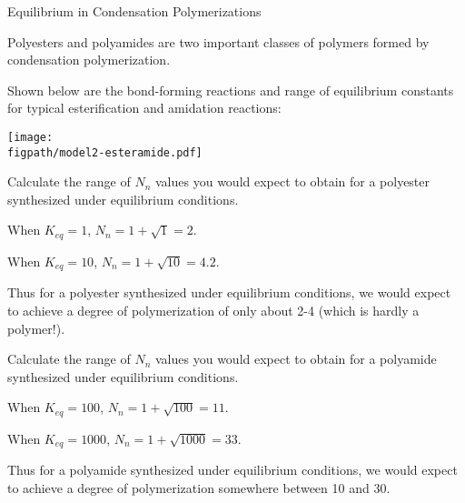 \begin{activity}{Equilibrium in Condensation Polymerizations}
\begin{ctqs}
\end{ctqs}
	
\begin{model}
\label{\labelbase:mdl:K}

Polyesters and polyamides are two important classes of polymers formed by condensation polymerization.

Shown below are the bond-forming reactions and range of equilibrium constants for typical esterification and amidation reactions:
	
		\vspace{0.1in}
		\centerline{\texttt{[image: \\figpath/model2-esteramide.pdf]}}

\end{model}

\begin{ctqs}
		\question Calculate the range of $N_n$ values you would expect to obtain for a polyester synthesized under equilibrium conditions.
		
			\begin{solution}[1.5in]{}
			
				When $K_{eq}=1$, $N_n = 1+ \sqrt{1} = 2$.
			
				When $K_{eq}=10$, $N_n = 1+ \sqrt{10} = 4.2$.
				
				Thus for a polyester synthesized under equilibrium conditions, we would expect to achieve a degree of polymerization of only about 2-4 (which is hardly a polymer!).			
			
			\end{solution}
		
		\question Calculate the range of $N_n$ values you would expect to obtain for a polyamide synthesized under equilibrium conditions.
		
			\begin{solution}[1.5in]{}
			
				When $K_{eq}=100$, $N_n = 1+ \sqrt{100} = 11$.
			
				When $K_{eq}=1000$, $N_n = 1+ \sqrt{1000} = 33$.
				
				Thus for a polyamide synthesized under equilibrium conditions, we would expect to achieve a degree of polymerization somewhere between 10 and 30.
			\end{solution}
		
\end{ctqs}

\begin{infobox}


\end{infobox}
\end{activity}
